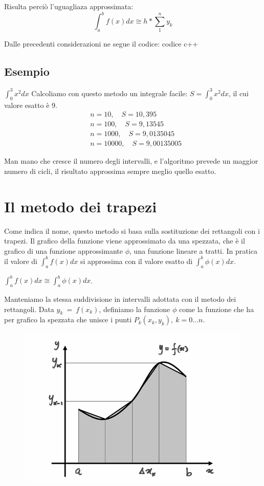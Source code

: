 \documentclass{article}
\begin{document}
Risulta perciò l'uguagliaza approssimata: \[\int_a^bf(x)dx\cong h*\sum_1^ny_k\]

Dalle precedenti considerazioni ne segue il codice:
codice c++

\subsection{Esempio}
$\int_0^3x^2dx$
Calcoliamo con questo metodo un integrale facile: $S=\int_0^3x^2dx$, il cui valore esatto è 9.
\begin{align*}
&n=10,\quad S=10,395\\
&n=100,\quad S=9,13545\\
&n=1000,\quad S=9,0135045\\
&n=10000,\quad S=9,00135005
\end{align*}

Man mano che cresce il numero degli intervalli, e l’algoritmo prevede un maggior numero di cicli, il risultato approssima sempre meglio quello esatto.

\newpage
\section{Il metodo dei trapezi}
Come indica il nome, questo metodo si basa sulla sostituzione dei rettangoli con i trapezi. Il grafico della funzione viene approssimato da una spezzata, che è il grafico di una funzione approssimante $\phi$, una funzione lineare a tratti. In pratica il valore di $\int_a^bf(x)dx$ si approssima con il valore esatto di $\int_a^b\phi(x)dx$.

$\int_a^bf(x)dx\cong\int_a^b\phi(x)dx$.

Manteniamo la stessa suddivisione in intervalli adottata con il metodo dei rettangoli. Data $y_k~=~f(x_k)$, definiamo la funzione $\phi$ come la funzione che ha per grafico la spezzata che unisce i punti $P_k(x_k,y_k),\ k=0 ... n$.

\begin{figure}[ht]
\centering
\includegraphics[scale=0.25]{img/09_02_int_trapezi.png} 
\label{fig:trap}
\end{figure}
\end{document}
